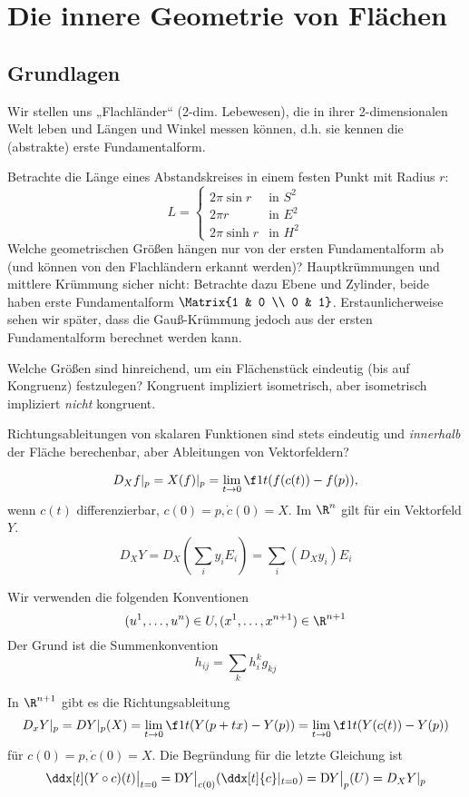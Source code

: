 \chapter{Die innere Geometrie von Flächen}


\section{Grundlagen}

Wir stellen uns „Flachländer“ (2-dim. Lebewesen), die in ihrer 2-dimensionalen Welt leben und Längen und Winkel messen können, d.h. sie kennen die (abstrakte) erste Fundamentalform.

Betrachte die Länge eines Abstandskreises in einem festen Punkt mit Radius $r$:
\[
	L = \begin{cases}
		2\pi \sin r & \text{in $S^2$} \\
		2\pi r & \text{in $E^2$} \\
		2\pi \sinh r & \text{in $H^2$}
	\end{cases}
\]
Welche geometrischen Größen hängen nur von der ersten Fundamentalform ab (und können von den Flachländern erkannt werden)?
Hauptkrümmungen und mittlere Krümmung sicher nicht:
Betrachte dazu Ebene und Zylinder, beide haben erste Fundamentalform $\Matrix{1 & 0 \\ 0 & 1}$.
Erstaunlicherweise sehen wir später, dass die Gauß-Krümmung jedoch aus der ersten Fundamentalform berechnet werden kann.

Welche Größen sind hinreichend, um ein Flächenstück eindeutig (bis auf Kongruenz) festzulegen?
Kongruent impliziert isometrisch, aber isometrisch impliziert \emph{nicht} kongruent.

Richtungsableitungen von skalaren Funktionen sind stets eindeutig und \emph{innerhalb} der Fläche berechenbar, aber Ableitungen von Vektorfeldern?

\[
	D_X f|_p = X(f)|_p
	= \lim_{t\to 0} \f 1t (f(c(t)) - f(p)),
\]
wenn $c(t)$ differenzierbar, $c(0) = p, \dot c(0) = X$.
Im $\R^n$ gilt für ein Vektorfeld $Y$.
\[
	D_X Y = D_X(\sum_{i} y_i E_i)
	= \sum_{i} (D_X y_i) E_i
\]


Wir verwenden die folgenden Konventionen
\[
	(u^1, \dotsc, u^n) \in U,
	(x^1, \dotsc, x^{n+1}) \in \R^{n+1}
\]
Der Grund ist die Summenkonvention
\[
	h_{ij} = \sum_{k} h_i^k g_{kj}
\]

In $\R^{n+1}$ gibt es die Richtungsableitung
\[
	D_xY|_p = DY|_p(X)
	= \lim_{t\to 0} \f 1t (Y(p+tx) - Y(p))
	= \lim_{t\to 0} \f 1t (Y(c(t)) - Y(p))
\]
für $c(0) = p, \dot c(0) = X$.
Die Begründung für die letzte Gleichung ist
\[
	\ddx[t](Y \circ c)(t) \big|_{t=0}
	= \Df[Y]\big|_{c(0)} (\ddx[t]{c}|_{t=0})
	= \Df[Y]\big|_{p}(U)
	= D_X Y|_p
\]

